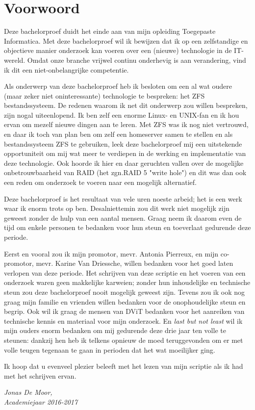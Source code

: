 
\chapter*{Voorwoord}
\label{ch:voorwoord}


Deze bachelorproef duidt het einde aan van mijn opleiding Toegepaste Informatica. Met deze bachelorproef wil ik bewijzen dat ik op een zelfstandige en objectieve manier onderzoek kan voeren over een (nieuwe) technologie in de IT-wereld. Omdat onze branche vrijwel continu onderhevig is aan verandering, vind ik dit een niet-onbelangrijke competentie. 

Als onderwerp van deze bachelorproef heb ik besloten om een al wat oudere (maar zeker niet oninteressante) technologie te bespreken: het ZFS bestandssysteem. De redenen waarom ik net dit onderwerp zou willen bespreken, zijn nogal uiteenlopend. Ik ben zelf een enorme Linux- en UNIX-fan en ik hou ervan om mezelf nieuwe dingen aan te leren. Met ZFS was ik nog niet vertrouwd, en daar ik toch van plan ben om zelf een homeserver samen te stellen en als bestandssysteem ZFS te gebruiken, leek deze bachelorproef mij een uitstekende opportuniteit om mij wat meer te verdiepen in de werking en implementatie van deze technologie. Ook hoorde ik hier en daar geruchten vallen over de mogelijke onbetrouwbaarheid van RAID (het zgn.RAID 5 "write hole") en dit was dan ook een reden om onderzoek te voeren naar een mogelijk alternatief.

Deze bachelorproef is het resultaat van vele uren noeste arbeid; het is een werk waar ik enorm trots op ben. Desalniettemin zou dit werk niet mogelijk zijn geweest zonder de hulp van een aantal mensen. Graag neem ik daarom even de tijd om enkele personen te bedanken voor hun steun en toeverlaat gedurende deze periode. 

Eerst en vooral zou ik mijn promotor, mevr. Antonia Pierreux, en mijn co-promotor, mevr. Karine Van Driessche, willen bedanken voor het goed laten verlopen van deze periode. Het schrijven van deze scriptie en het voeren van een onderzoek waren geen makkelijke karweien; zonder hun inhoudelijke en technische steun zou deze bachelorproef nooit mogelijk geweest zijn. Tevens zou ik ook nog graag mijn familie en vrienden willen bedanken voor de onophoudelijke steun en begrip. Ook wil ik graag de mensen van DViT bedanken voor het aanreiken van technische kennis en materiaal voor mijn onderzoek. En \textit{last but not least} wil ik mijn ouders enorm bedanken om mij gedurende deze drie jaar ten volle te steunen: dankzij hen heb ik telkens opnieuw de moed teruggevonden om er met volle teugen tegenaan te gaan in perioden dat het wat moeilijker ging.

Ik hoop dat u evenveel plezier beleeft met het lezen van mijn scriptie als ik had met het schrijven ervan.

\begin{flushright}
  \textit{Jonas De Moor,} \\ 
  \textit{Academiejaar 2016-2017}
\end{flushright}
